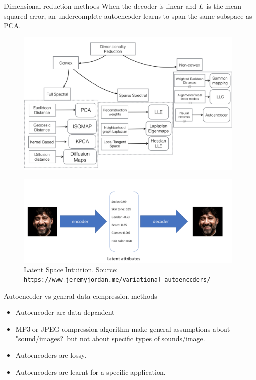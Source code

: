 \documentclass[xcolor=pdftex,dvipsnames,table,mathserif]{beamer}
\begin{document}
\begin{frame}{Dimensional reduction methods}
When the decoder is linear and $L$ is the mean squared error, an undercomplete autoencoder learns to span the same subspace as PCA.
\begin{figure}
\includegraphics[width=.9\columnwidth]{../graphics/DimensionalityReduction}
\end{figure}
\end{frame}


\begin{frame}
\begin{figure}
\includegraphics[width=.95\columnwidth]{../graphics/LatentSpaceIntuition0}
\caption{Latent Space Intuition. Source: \texttt{https://www.jeremyjordan.me/variational-autoencoders/}}
\end{figure}
\end{frame}



\begin{frame}{Autoencoder vs general data compression methods}
\begin{itemize}
\item Autoencoder are data-dependent
\item MP3 or JPEG compression algorithm make general assumptions about "sound/images?, but not about
specific types of sounds/image.
\item Autoencoders are lossy.
\item Autoencoders are learnt for a specific application.
\end{itemize}
\end{frame}
\end{document}
